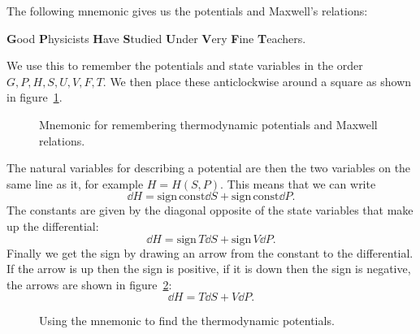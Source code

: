     The following mnemonic gives us the potentials and Maxwell's relations:
    \begin{displayquote}
        \textbf{G}ood \textbf{P}hysicists \textbf{H}ave \textbf{S}tudied \textbf{U}nder \textbf{V}ery \textbf{F}ine \textbf{T}eachers.
    \end{displayquote}
    We use this to remember the potentials and state variables in the order \(G, P, H, S, U, V, F, T\).
    We then place these anticlockwise around a square as shown in figure~\ref{fig:mnemonic}.
    \begin{figure}[ht]
        \centering
        \caption{Mnemonic for remembering thermodynamic potentials and Maxwell relations.}
        \label{fig:mnemonic}
    \end{figure}
    The natural variables for describing a potential are then the two variables on the same line as it, for example \(H = H(S, P)\).
    This means that we can write
    \[\dd{H} = \text{sign}\,\text{const}\dd{S} + \text{sign}\,\text{const}\dd{P}.\]
    The constants are given by the diagonal opposite of the state variables that make up the differential:
    \[\dd{H} = \text{sign}\,T\dd{S} + \text{sign}\,V\dd{P}.\]
    Finally we get the sign by drawing an arrow from the constant to the differential.
    If the arrow is up then the sign is positive, if it is down then the sign is negative, the arrows are shown in figure~\ref{fig:mnemonic for H}:
    \[\dd{H} = T\dd{S} + V\dd{P}.\]
    \begin{figure}[ht]
        \centering
        \caption{Using the mnemonic to find the thermodynamic potentials.}
        \label{fig:mnemonic for H}
    \end{figure}
